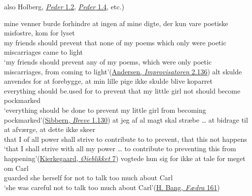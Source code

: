 also Holberg, \href{http://holbergsskrifter.dk/holberg-public/view?docId=Paars%2FPaars.page&brand=&chunk.id=book1song2&toc.id=book1&toc.depth=1}{\textit{Peder} 1.2}, \href{http://holbergsskrifter.dk/holberg-public/view?docId=Paars%2FPaars.page&brand=&chunk.id=book1song4&toc.id=book1&toc.depth=1}{\textit{Peder} 1.4}, etc.) %

\ex 
\gll mine venner burde forhindre at ingen af mine digte, der kun vare poetiske misfostre, kom for lyset\\
 my friends should prevent that none of my poems which only were poetic miscarriages came to light\\
\glt `my friends should prevent any of my poems, which were only poetic miscarriages, from coming to light'\hfill(\href{https://tekster.kb.dk/text/adl-texts-andersen03val-root#idm140167596697696}{Andersen, \textit{Improvisatoren} 2.136})
\ex 
\gll alt skulde anvendes for at forebygge, at min lille pige ikke skulde blive koparret\\
 everything should be.used for to prevent that my little girl not should become pockmarked\\
\glt `everything should be done to prevent my little girl from becoming pockmarked'\hfill(\href{https://tekster.kb.dk/text/adl-texts-sibbern02val-root#s114}{Sibbern, \textit{Breve} 1.130})
\ex 
\gll at jeg af al magt skal stræbe {\dots} at bidrage til at afværge, at dette ikke skeer\\
 that I of all power shall strive {} to contribute to to prevent, that this not happens\\
\glt `that I shall strive with all my power {\dots} to contribute to preventing this from happening'\hfill(\href{https://archive.org/details/ieblikketno00kiergoog/page/n16/mode/2up?q=%22at+jeg+af%22&view=theater}{Kierkegaard, \textit{Øieblikket} 7})
\ex 
\gll vogtede hun sig for ikke at tale for meget om Carl\\
 guarded she herself for not to talk too much about Carl\\
\glt `she was careful not to talk too much about Carl'\hfill(\href{https://tekster.kb.dk/text/adl-texts-bang11val-shoot-workid54092#s163}{H. Bang, \textit{Fædra} 161}) %
\z
\z

